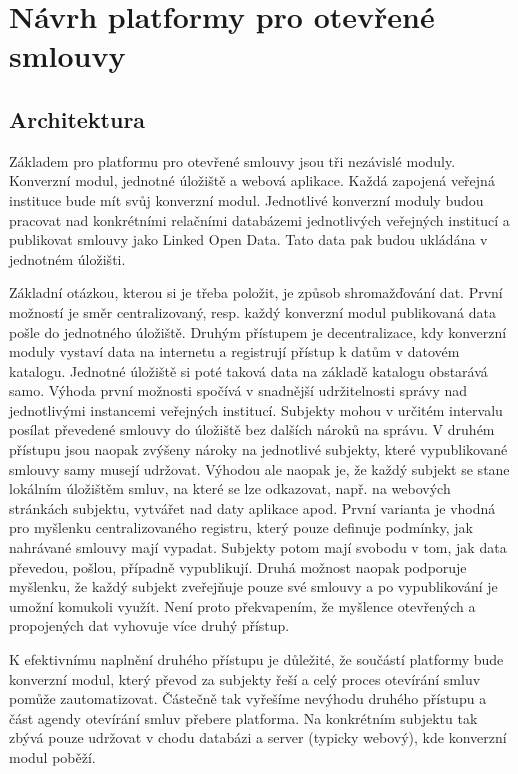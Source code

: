 \chapter{Návrh platformy pro otevřené smlouvy}
\label{sec:kap6}

\section{Architektura}

Základem pro platformu pro otevřené smlouvy jsou tři nezávislé moduly. Konverzní modul, jednotné úložiště a webová aplikace. Každá zapojená veřejná instituce bude mít svůj konverzní modul. Jednotlivé konverzní moduly budou pracovat nad konkrétními relačními databázemi jednotlivých veřejných institucí a publikovat smlouvy jako Linked Open Data. Tato data pak budou ukládána v jednotném úložišti.

Základní otázkou, kterou si je třeba položit, je způsob shromažďování dat. První možností je směr centralizovaný, resp. každý konverzní modul publikovaná data pošle do jednotného úložiště. Druhým přístupem je decentralizace, kdy konverzní moduly vystaví data na internetu a registrují přístup k datům v datovém katalogu. Jednotné úložiště si poté taková data na základě katalogu obstarává samo. Výhoda první možnosti spočívá v snadnější udržitelnosti správy nad jednotlivými instancemi veřejných institucí. Subjekty mohou v určitém intervalu posílat převedené smlouvy do úložiště bez dalších nároků na správu. V druhém přístupu jsou naopak zvýšeny nároky na jednotlivé subjekty, které vypublikované smlouvy samy musejí  udržovat. Výhodou ale naopak je, že každý subjekt se stane lokálním úložištěm smluv, na které se lze odkazovat, např. na webových stránkách subjektu, vytvářet nad daty aplikace apod. První varianta je vhodná pro myšlenku centralizovaného registru, který pouze definuje podmínky, jak nahrávané smlouvy mají vypadat. Subjekty potom mají svobodu v tom, jak data převedou, pošlou, případně vypublikují. Druhá možnost naopak podporuje myšlenku, že každý subjekt zveřejňuje pouze své smlouvy a po vypublikování je umožní komukoli využít. Není proto překvapením, že myšlence otevřených a propojených dat vyhovuje více druhý přístup. 

K efektivnímu naplnění druhého přístupu je důležité, že součástí platformy bude konverzní modul, který převod za subjekty řeší a celý proces otevírání smluv pomůže zautomatizovat. Částečně tak vyřešíme nevýhodu druhého přístupu a část agendy otevírání smluv přebere platforma. Na konkrétním subjektu tak zbývá pouze udržovat v chodu databázi a server (typicky webový), kde konverzní modul poběží. 

